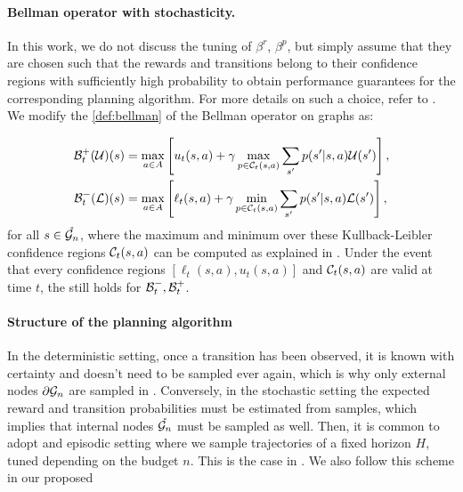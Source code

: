 \documentclass[runningheads]{llncs}
\begin{document}
\paragraph{Bellman operator with stochasticity.}

In this work, we do not discuss the tuning of $\beta^r$, $\beta^p$, but simply assume that they are chosen such that the rewards and transitions belong to their confidence regions with sufficiently high probability to obtain performance guarantees for the corresponding planning algorithm. For more details on such a choice, refer to \citep[e.g.][]{Leurent2019practical, MDPGapE2020}. We modify the \cref{def:bellman} of the Bellman operator on graphs as:

\begin{align*}
\mathcal{B}_t^+(\mathcal{U})(s) &= \max_{a\in A} \left[u_t(s,a) + \gamma \max_{p \in \mathcal{C}_t(s,a)} \sum_{s'} p(s'|s,a) \mathcal{U}(s')\right], \\
\mathcal{B}_t^-(\mathcal{L})(s) &= \max_{a\in A} \left[\ell_t(s,a) + \gamma \min_{p \in \mathcal{C}_t(s,a)} \sum_{s'} p(s'|s,a)\mathcal{L}(s')\right],
\end{align*}
for all $s\in\mathring{\mathcal{G}_n}$, where the maximum and minimum over these Kullback-Leibler confidence regions $\mathcal{C}_t(s,a)$ can be computed as explained in \citep[Appendix A of][]{Filippi2010optimism}. Under the event that every confidence regions $[\ell_t(s,a), u_t(s,a)]$ and $\mathcal{C}_t(s,a)$ are valid at time $t$, the  still holds for $\mathcal{B}_t^-, \mathcal{B}_t^+$.

\paragraph{Structure of the planning algorithm}

In the deterministic setting, once a transition has been observed, it is known with certainty and doesn't need to be sampled ever again, which is why only external nodes ${\partial \mathcal{G}_n}$ are sampled in \GBOPD. Conversely, in the stochastic setting the expected reward and transition probabilities must be estimated from samples, which implies that internal nodes $\mathring{\mathcal{G}_n}$ must be sampled as well. Then, it is common to adopt and episodic setting where we sample trajectories of a fixed horizon $H$, tuned depending on the budget $n$. This is the case in  \citep[e.g.][]{Kearns02SS,Kocsis06UCT,Bubeck2010open,Feldman14BRUE,Leurent2019practical,MDPGapE2020}. We also follow this scheme in our proposed \GBOP
\end{document}
